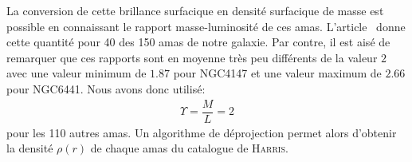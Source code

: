 				La conversion de cette brillance surfacique en densité surfacique de masse est possible
				en connaissant le rapport masse-luminosité de ces amas. L'article~\cite{McL} donne cette
				quantité pour 40 des 150 amas de notre galaxie.
				Par contre, il est aisé de remarquer que ces rapports sont en
				moyenne très peu différents de la valeur $2$ avec une
				valeur minimum de $1.87$ pour NGC4147 et une valeur maximum de
				$2.66$ pour NGC6441. Nous avons donc utilisé: %
				\begin{align}
					\Upsilon = \dfrac{M}{L} = 2
				\end{align}
				pour les 110 autres amas.
				Un algorithme de déprojection permet alors d'obtenir la densité $\rho(r)$ de chaque amas du catalogue de \textsc{Harris}.

